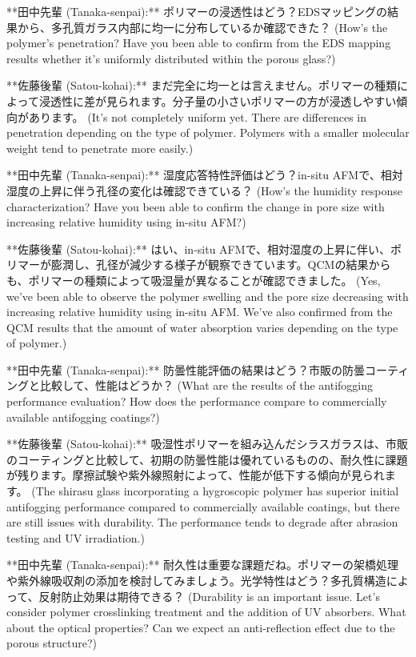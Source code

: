 \documentclass{article}
\begin{document}
**田中先輩 (Tanaka-senpai):** ポリマーの浸透性はどう？EDSマッピングの結果から、多孔質ガラス内部に均一に分布しているか確認できた？ (How's the polymer's penetration? Have you been able to confirm from the EDS mapping results whether it's uniformly distributed within the porous glass?)

**佐藤後輩 (Satou-kohai):** まだ完全に均一とは言えません。ポリマーの種類によって浸透性に差が見られます。分子量の小さいポリマーの方が浸透しやすい傾向があります。 (It's not completely uniform yet. There are differences in penetration depending on the type of polymer. Polymers with a smaller molecular weight tend to penetrate more easily.)

**田中先輩 (Tanaka-senpai):** 湿度応答特性評価はどう？in-situ AFMで、相対湿度の上昇に伴う孔径の変化は確認できている？ (How's the humidity response characterization? Have you been able to confirm the change in pore size with increasing relative humidity using in-situ AFM?)

**佐藤後輩 (Satou-kohai):** はい、in-situ AFMで、相対湿度の上昇に伴い、ポリマーが膨潤し、孔径が減少する様子が観察できています。QCMの結果からも、ポリマーの種類によって吸湿量が異なることが確認できました。 (Yes, we've been able to observe the polymer swelling and the pore size decreasing with increasing relative humidity using in-situ AFM. We've also confirmed from the QCM results that the amount of water absorption varies depending on the type of polymer.)

**田中先輩 (Tanaka-senpai):** 防曇性能評価の結果はどう？市販の防曇コーティングと比較して、性能はどうか？ (What are the results of the antifogging performance evaluation? How does the performance compare to commercially available antifogging coatings?)

**佐藤後輩 (Satou-kohai):** 吸湿性ポリマーを組み込んだシラスガラスは、市販のコーティングと比較して、初期の防曇性能は優れているものの、耐久性に課題が残ります。摩擦試験や紫外線照射によって、性能が低下する傾向が見られます。 (The shirasu glass incorporating a hygroscopic polymer has superior initial antifogging performance compared to commercially available coatings, but there are still issues with durability. The performance tends to degrade after abrasion testing and UV irradiation.)

**田中先輩 (Tanaka-senpai):** 耐久性は重要な課題だね。ポリマーの架橋処理や紫外線吸収剤の添加を検討してみましょう。光学特性はどう？多孔質構造によって、反射防止効果は期待できる？ (Durability is an important issue. Let's consider polymer crosslinking treatment and the addition of UV absorbers. What about the optical properties? Can we expect an anti-reflection effect due to the porous structure?)
\end{document}
